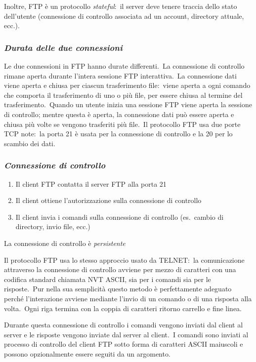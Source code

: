 Inoltre, FTP è un protocollo \emph{stateful}:\ il server deve tenere traccia dello stato dell'utente (connessione di controllo associata ad un account, directory attuale, ecc.).

\subsubsection{\emph{Durata delle due connessioni}}

Le due connessioni in FTP hanno durate differenti.\
La connessione di controllo rimane aperta durante l'intera sessione FTP interattiva.\
La connessione dati viene aperta e chiusa per ciascun trasferimento file:\ viene aperta a ogni comando che comporta il trasferimento di uno o più file, per essere chiusa al termine del trasferimento.\
Quando un utente inizia una sessione FTP viene aperta la sessione di controllo; mentre questa è aperta, la connessione dati può essere aperta e chiusa più volte se vengono trasferiti più file.\
Il protocollo FTP usa due porte TCP note:\ la porta 21 è usata per la connessione di controllo e la 20 per lo scambio dei dati.

\subsubsection{\emph{Connessione di controllo}}

\begin{enumerate}
    \item Il client FTP contatta il server FTP alla porta 21
    \item Il client ottiene l'autorizzazione sulla connessione di controllo
    \item Il client invia i comandi sulla connessione di controllo (es.\
          cambio di directory, invio file, ecc.)
\end{enumerate}
La connessione di controllo è \emph{persistente}

Il protocollo FTP usa lo stesso approccio usato da TELNET:\ la comunicazione attraverso la connessione di controllo avviene per mezzo di caratteri con una codifica standard chiamata NVT ASCII, sia per i comandi sia per le risposte.\
Pur nella sua semplicità questo metodo è perfettamente adeguato perché l'interazione avviene mediante l'invio di un comando o di una  risposta alla volta.\
Ogni riga termina con la coppia di caratteri ritorno carrello e fine linea.

Durante questa connessione di controllo i comandi vengono inviati dal client al server e le risposte vengono inviate dal server al client.\
I comandi sono inviati al processo di controllo del client FTP sotto forma di caratteri ASCII maiuscoli e possono opzionalmente essere seguiti da un argomento.


